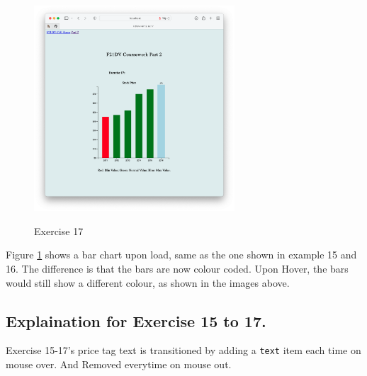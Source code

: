 \documentclass{scrreprt}
\begin{document}
\begin{figure}[!ht]
    \includegraphics[width = 7.5cm]{images/ex17_4.png}
    \label{fig:ex17}
    \caption{Exercise 17}
\end{figure}
\FloatBarrier

Figure \ref{fig:ex17} shows a bar chart upon load, same as the one shown in example 15 and 16. The difference is that the bars are now colour coded. Upon Hover, the bars would still show a different colour, as shown in the images above.  

\subsection{Explaination for Exercise 15 to 17.}
Exercise 15-17's price tag text is transitioned by adding a \verb|text| item each time on mouse over. And Removed everytime on mouse out.


\newpage
\end{document}
